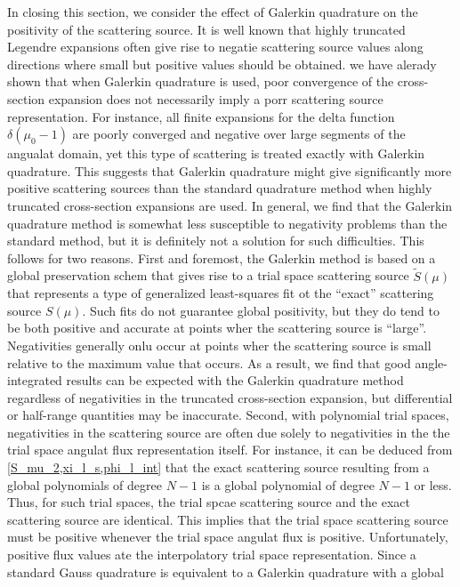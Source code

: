 In closing this section, we consider the effect of Galerkin quadrature on the
positivity of the scattering source. It is well known that highly truncated
Legendre expansions often give rise to negatie scattering source values along
directions where small but positive values should be obtained. we have alerady
shown that when Galerkin quadrature is used, poor convergence of the
cross-section expansion does not necessarily imply a porr scattering source
representation. For instance, all finite expansions for the delta function
$\delta(\mu_0-1)$ are poorly converged and negative over large segments of the
angualat domain, yet this type of scattering is treated exactly with Galerkin
quadrature. This suggests that Galerkin quadrature might give significantly
more positive scattering sources than the standard quadrature method when
highly truncated cross-section expansions are used. In general, we find that
the Galerkin quadrature method is somewhat less susceptible to negativity
problems than the standard method, but it is definitely not a solution for
such difficulties. This follows for two reasons. First and foremost, the
Galerkin method is based on a global preservation schem that gives rise to a
trial space scattering source $\tilde{S}(\mu)$ that represents a type of
generalized least-squares fit ot the ``exact'' scattering source $S(\mu)$.
Such fits do not guarantee global positivity, but they do tend to be both
positive and accurate at points wher the scattering source is ``large''.
Negativities generally onlu occur at points wher the scattering source is
small relative to the maximum value that occurs. As a result, we find that
good angle-integrated results can be expected with the Galerkin quadrature
method regardless of negativities in the truncated cross-section expansion,
but differential or half-range quantities may be inaccurate. Second, with
polynomial trial spaces, negativities in the scattering source are often due
solely to negativities in the the trial space angulat flux representation
itself. For instance, it can be deduced from \cref{S_mu_2,xi_l_s,phi_l_int}
that the exact scattering source resulting from a global polynomials of degree
$N-1$ is a global polynomial of degree $N-1$ or less. Thus, for such trial
spaces, the trial spcae scattering source and the exact scattering source are
identical. This implies that the trial space scattering source must be
positive whenever the trial space angulat flux is positive. Unfortunately,
positive flux values ate the interpolatory trial space representation. Since a
standard Gauss quadrature is equivalent to a Galerkin quadrature with a global
